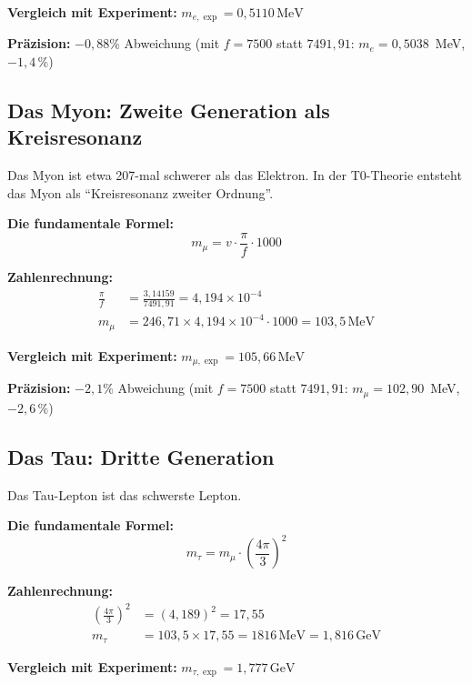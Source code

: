	\textbf{Vergleich mit Experiment:} \(m_{e,\exp} = 0{,}5110\,\text{MeV}\)
	
	\textbf{Präzision:} \(-0{,}88\%\) Abweichung (mit $f = 7500$ statt $7491{,}91$: $m_e = 0{,}5038$~MeV, $-1{,}4\,\%$)
	
	\subsection{Das Myon: Zweite Generation als Kreisresonanz}
	
	Das Myon ist etwa 207-mal schwerer als das Elektron. In der T0-Theorie entsteht das Myon als \enquote{Kreisresonanz zweiter Ordnung}.
	
	\textbf{Die fundamentale Formel:}
	\begin{equation}
		\boxed{m_\mu = v \cdot \frac{\pi}{f} \cdot 1000}
	\end{equation}
	
	\textbf{Zahlenrechnung:}
	\begin{align}
		\frac{\pi}{f} &= \frac{3{,}14159}{7491{,}91} = 4{,}194 \times 10^{-4} \\
		m_\mu &= 246{,}71 \times 4{,}194 \times 10^{-4} \cdot 1000 = 103{,}5\,\text{MeV}
	\end{align}
	
	\textbf{Vergleich mit Experiment:} \(m_{\mu,\exp} = 105{,}66\,\text{MeV}\)
	
	\textbf{Präzision:} \(-2{,}1\%\) Abweichung (mit $f = 7500$ statt $7491{,}91$: $m_\mu = 102{,}90$~MeV, $-2{,}6\,\%$)
	
	\subsection{Das Tau: Dritte Generation}
	
	Das Tau-Lepton ist das schwerste Lepton.
	
	\textbf{Die fundamentale Formel:}
	\begin{equation}
		\boxed{m_\tau = m_\mu \cdot \left(\frac{4\pi}{3}\right)^2}
	\end{equation}
	
	\textbf{Zahlenrechnung:}
	\begin{align}
		\left(\frac{4\pi}{3}\right)^2 &= (4{,}189)^2 = 17{,}55 \\
		m_\tau &= 103{,}5 \times 17{,}55 = 1816\,\text{MeV} = 1{,}816\,\text{GeV}
	\end{align}
	
	\textbf{Vergleich mit Experiment:} \(m_{\tau,\exp} = 1{,}777\,\text{GeV}\)
	
